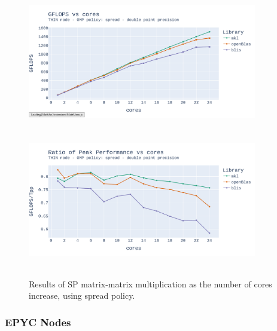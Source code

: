 \documentclass{report}
\begin{document}
\begin{figure}[h!]
\hspace*{-2.5cm}
\includegraphics[width=10cm, height=6cm]{./images/fixed_size_thin_double_gflops_spread.pdf}
\includegraphics[width=10cm, height=6cm]{./images/fixed_size_thin_double_gflops_spread_ratio.pdf}
\caption{\label{fig:fixed_size_thin_double_spread} Results of SP matrix-matrix multiplication 
as the number of cores increase, using spread policy.}
\end{figure}

\subsubsection{EPYC Nodes}
\end{document}
